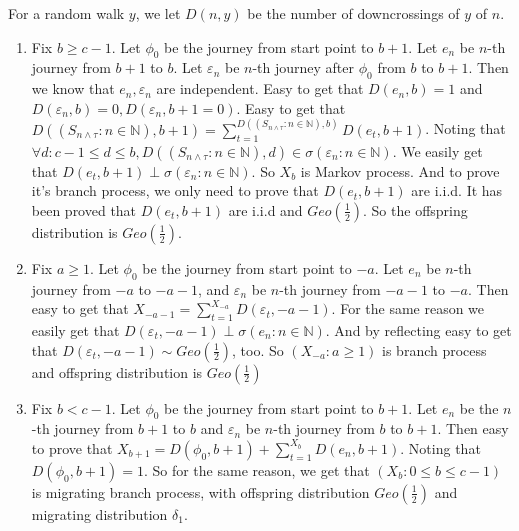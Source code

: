 \documentclass[../main]{subfiles}
\begin{document}
\begin{solution}
  For a random walk \(y\), we let \(D(n,y)\) be the number of downcrossings of \(y\) of \(n\).
  \begin{enumerate}
    \item Fix \(b \geq c-1\). Let \(\phi_0\) be the journey from start point to \(b+1\).
      Let \(e_n\) be \(n\)-th journey from \(b+1\) to \(b\).
      Let \(\varepsilon_n\) be \(n\)-th journey after \(\phi_0\) from \(b\) to \(b+1\).
      Then we know that \(e_n,\varepsilon_n\) are independent.
      Easy to get that \(D(e_n,b)=1\) and \(D(\varepsilon_n,b)=0,D(\varepsilon_n,b+1=0)\).
      Easy to get that \(D((S_{n \wedge \tau}:n \in \mathbb{N}),b+1)=\sum_{t=1}^{D((S_{n \wedge \tau}:n \in \mathbb{N}),b)} D(e_t,b+1) \).
      Noting that \(\forall d:c-1 \leq d \leq b,D((S_{n \wedge \tau}:n \in \mathbb{N}),d) \in \sigma(\varepsilon_n:n \in \mathbb{N})\).
      We easily get that \(D(e_t,b+1) \perp \sigma(\varepsilon_n:n \in \mathbb{N})\).
      So \(X_b\) is Markov process. And to prove it's branch process, we only need to prove that \(D(e_t,b+1)\) are i.i.d.
      It has been proved that \(D(e_t,b+1)\) are i.i.d and \(Geo(\frac{1}{2})\).
      So the offspring distribution is \(Geo(\frac{1}{2})\).
    \item Fix \(a \geq 1\). Let \(\phi_0\) be the journey from start point to \(-a\).
      Let \(e_n\) be \(n\)-th journey from \(-a\) to \(-a-1\), and \(\varepsilon_n\) be \(n\)-th journey from \(-a-1\) to \(-a\).
      Then easy to get that \(X_{-a-1}=\sum_{t=1}^{X_{-a}} D(\varepsilon_t,-a-1)\).
      For the same reason we easily get that \(D(\varepsilon_t,-a-1)\perp \sigma(e_n:n \in \mathbb{N})\).
      And by reflecting easy to get that \(D(\varepsilon_t,-a-1) \sim Geo(\frac{1}{2})\), too.
      So \((X_{-a}:a \geq 1)\) is branch process
      and offspring distribution is \(Geo(\frac{1}{2})\)

    \item Fix \(b<c-1\). Let \(\phi_0\) be the journey from start point to \(b+1\).
      Let \(e_n\) be the \(n\)-th journey from \(b+1\) to \(b\) and \(\varepsilon_n\) be \(n\)-th journey from \(b\) to \(b+1\).
      Then easy to prove that \(X_{b+1}=D(\phi_0,b+1)+\sum_{t=1}^{X_b} D(e_n,b+1)\).
      Noting that \(D(\phi_0,b+1)=1\). So for the same reason, we get that \((X_b:0 \leq b \leq c-1)\) is migrating branch process,
      with offspring distribution \(Geo(\frac{1}{2})\) and migrating distribution \(\delta_1\).
  \end{enumerate}
\end{solution}
\end{document}
